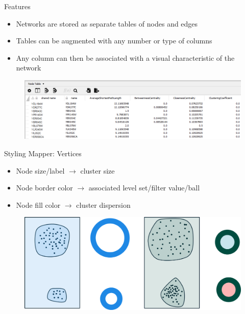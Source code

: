 \documentclass{beamer}
\begin{document}
\begin{frame}{Features}
  \begin{itemize}
    \item Networks are stored as separate tables of nodes and edges
    \item Tables can be augmented with any number or type of columns
    \item Any column can then be associated with a visual characteristic of the network
  \end{itemize}
  \begin{figure}
    \begin{center}
      \includegraphics[width=1\textwidth]{nodetable.png}
    \end{center}
  \end{figure}
\end{frame}

\begin{frame}{Styling Mapper: Vertices}
  \begin{itemize}
    \item Node size/label $\to$ cluster size
    \item Node border color $\to$ associated level set/filter value/ball
    \item Node fill color $\to$ cluster dispersion
  \end{itemize}
  \begin{figure}
    \begin{center}
      \includegraphics[width=1\textwidth]{nodestyling.png}
    \end{center}
  \end{figure}
\end{frame}
\end{document}
